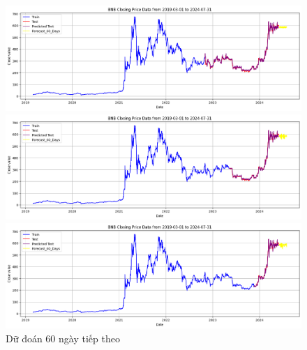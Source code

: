 \documentclass[conference]{IEEEtran}
\begin{document}
\begin{figure}[H]
    \centering
    \begin{minipage}{0.15\textwidth}
    \centering
    \includegraphics[width=1\textwidth]{Figure/RandomForest_BNB_60days_73.png}
    \end{minipage}
    \hfill
    \begin{minipage}{0.15\textwidth}
    \centering
    \includegraphics[width=1\textwidth]{Figure/RandomForest_BNB_60days_82.png}
    \end{minipage}
    \hfill
    \begin{minipage}{0.15\textwidth}
    \centering
    \includegraphics[width=1\textwidth]{Figure/RandomForest_BNB_60days_91.png}
    \end{minipage}
    \caption{Dữ đoán 60 ngày tiếp theo}
    \label{fig:1}
\end{figure}
\end{document}
